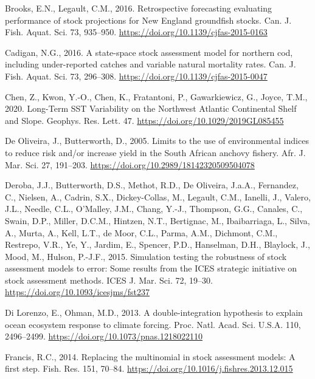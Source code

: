 \documentclass[]{article}
\begin{document}
\leavevmode\hypertarget{ref-brooks2016Retrospective}{}%
Brooks, E.N., Legault, C.M., 2016. Retrospective forecasting evaluating
performance of stock projections for New England groundfish stocks. Can.
J. Fish. Aquat. Sci. 73, 935--950.
\url{https://doi.org/10.1139/cjfas-2015-0163}

\leavevmode\hypertarget{ref-cadigan2016Statespace}{}%
Cadigan, N.G., 2016. A state-space stock assessment model for northern
cod, including under-reported catches and variable natural mortality
rates. Can. J. Fish. Aquat. Sci. 73, 296--308.
\url{https://doi.org/10.1139/cjfas-2015-0047}

\leavevmode\hypertarget{ref-chen2020Long}{}%
Chen, Z., Kwon, Y.-O., Chen, K., Fratantoni, P., Gawarkiewicz, G.,
Joyce, T.M., 2020. Long-Term SST Variability on the Northwest Atlantic
Continental Shelf and Slope. Geophys. Res. Lett. 47.
\url{https://doi.org/10.1029/2019GL085455}

\leavevmode\hypertarget{ref-deoliveira2005Limits}{}%
De Oliveira, J., Butterworth, D., 2005. Limits to the use of
environmental indices to reduce risk and/or increase yield in the South
African anchovy fishery. Afr. J. Mar. Sci. 27, 191--203.
\url{https://doi.org/10.2989/18142320509504078}

\leavevmode\hypertarget{ref-deroba2015Simulation}{}%
Deroba, J.J., Butterworth, D.S., Methot, R.D., De Oliveira, J.a.A.,
Fernandez, C., Nielsen, A., Cadrin, S.X., Dickey-Collas, M., Legault,
C.M., Ianelli, J., Valero, J.L., Needle, C.L., O'Malley, J.M., Chang,
Y.-J., Thompson, G.G., Canales, C., Swain, D.P., Miller, D.C.M.,
Hintzen, N.T., Bertignac, M., Ibaibarriaga, L., Silva, A., Murta, A.,
Kell, L.T., de Moor, C.L., Parma, A.M., Dichmont, C.M., Restrepo, V.R.,
Ye, Y., Jardim, E., Spencer, P.D., Hanselman, D.H., Blaylock, J., Mood,
M., Hulson, P.-J.F., 2015. Simulation testing the robustness of stock
assessment models to error: Some results from the ICES strategic
initiative on stock assessment methods. ICES J. Mar. Sci. 72, 19--30.
\url{https://doi.org/10.1093/icesjms/fst237}

\leavevmode\hypertarget{ref-dilorenzo2013Doubleintegration}{}%
Di Lorenzo, E., Ohman, M.D., 2013. A double-integration hypothesis to
explain ocean ecosystem response to climate forcing. Proc. Natl. Acad.
Sci. U.S.A. 110, 2496--2499.
\url{https://doi.org/10.1073/pnas.1218022110}

\leavevmode\hypertarget{ref-francis2014Replacing}{}%
Francis, R.C., 2014. Replacing the multinomial in stock assessment
models: A first step. Fish. Res. 151, 70--84.
\url{https://doi.org/10.1016/j.fishres.2013.12.015}
\end{document}
